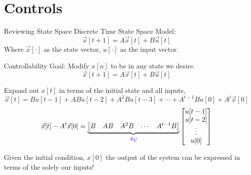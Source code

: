 \section{Controls}

\begin{frame}{Reviewing State Space}
    Discrete Time State Space Model:
    \[
        \vec x[t+1] = A \vec x[t] + B \vec u[t]
    \]
    Where \(\vec x[\cdot]\) as the state vector, \(u[\cdot]\) as the input vector.
\end{frame}


\begin{frame}{Controllability}
    Goal: Modify \(x[n]\) to be in any state we desire.
    \[
        \vec x[t+1] = A \vec x[t] + B \vec u[t]
    \]

    Expand out \(x[t]\) in terms of the initial state and all inputs,
    \[
        \vec x[t] = B u[t - 1]
                + A B u[t - 2]
                + A^2 B u[t - 3] + \cdots
                + A^{t - 1} B u[0]
                + A^t \vec x[0]
    \]
    \[
        \vec x[t] - A^t \vec x[0] =
        \underbrace{\begin{bmatrix}
            B & AB & A^2 B & \cdots & A^{t - 1} B
        \end{bmatrix}}_{\color{blue}\triangleq \mathcal{C}}
        \begin{bmatrix}
            u[t - 1] \\
            u[t - 2] \\
            \vdots \\
            u[0] \\
        \end{bmatrix}
    \]

    \pause
    Given the initial condition, \(x[0]\) the output of the system can be  expressed in terms of the solely our inputs!
\end{frame}

